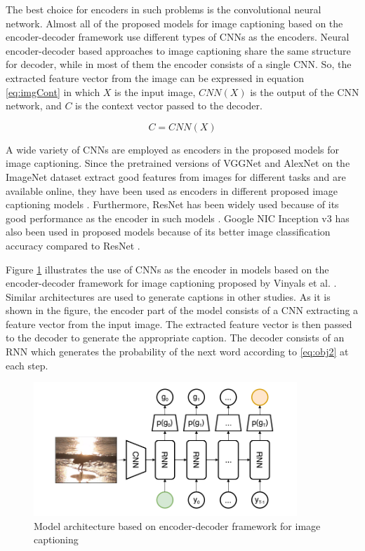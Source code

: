 \documentclass[preprint, 10pt]{elsarticle}
\begin{document}
		The best choice for encoders in such problems is the convolutional neural network. Almost all of the proposed models for image captioning based on the encoder-decoder framework use different types of CNNs as the encoders. Neural encoder-decoder based approaches to image captioning share the same structure for decoder, while in most of them the encoder consists of a single CNN. So, the extracted feature vector from the image can be expressed in equation \eqref{eq:imgCont} in which $X$ is the input image, $CNN(X)$ is the output of the CNN network, and $C$ is the context vector passed to the decoder.
		
		\begin{equation}
			C = CNN(X)
			\label{eq:imgCont}
		\end{equation} 
		
		A wide variety of CNNs are employed as encoders in the proposed models for image captioning. Since the pretrained versions of VGGNet \cite{simonyan2014very} and AlexNet \cite{krizhevsky2012imagenet} on the ImageNet dataset \cite{deng2009imagenet} extract good features from images for different tasks and are available online, they have been used as encoders in different proposed image captioning models \cite{karpathy2015deep} \cite{chen2017sca} \cite{pedersoli2017areas}. Furthermore, ResNet\cite{he2016deep} has been widely used because of its good performance as the encoder in such models \cite{lu2017knowing} \cite{rennie2017self} \cite{anderson2017bottom} \cite{yao2017boosting}. Google NIC Inception v3 \cite{szegedy2016rethinking} has also been used in proposed models because of its better image classification accuracy compared to ResNet \cite{zhang2017actor} \cite{ioffe2015batch} \cite{vinyals2015show} \cite{liu2017improved}. 
		
		Figure \ref{fig:imgCpt} illustrates the use of CNNs as the encoder in models based on the encoder-decoder framework for image captioning proposed by Vinyals et al. \cite{vinyals2015show}. Similar architectures are used to generate captions in other studies. As it is shown in the figure, the encoder part of the model consists of a CNN extracting a feature vector from the input image. The extracted feature vector is then passed to the decoder to generate the appropriate caption. The decoder consists of an RNN which generates the probability of the next word according to \eqref{eq:obj2} at each step.
		
		\begin{figure}[h]
			\centering
			\includegraphics[scale=1]{Imgs/CNNImgCpt.png}
			\caption{Model architecture based on encoder-decoder framework for image captioning \cite{vinyals2015show}}
			\label{fig:imgCpt}
		\end{figure}
		
\end{document}
